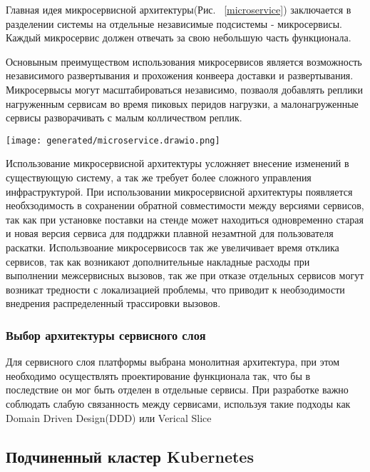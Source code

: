 Главная идея микросервисной архитектуры(Рис. ~\ref{microservice}) заключается в разделении системы на отдельные независимые подсистемы - микросервисы. Каждый микросервис должен отвечать за свою небольшую часть функционала.

Основыным преимуществом использования микросервисов является возможность независимого развертывания и прохожения конвеера доставки и развертывания. Микросервысы могут масштабироваться независимо, позваоля добавлять реплики нагруженным сервисам во время пиковых перидов нагрузки, а малонагруженные сервисы разворачивать с малым колличеством реплик.

\begin{figure*}[!t]
  \centering
  \texttt{[image: generated/microservice.drawio.png]}
  \caption{Приложение с микросервисной архитектурой}
  \label{microservice}
\end{figure*}

Использование микросервисной архитектуры усложняет внесение изменений в существующую систему, а так же требует более сложного управления инфраструктурой.
При использовании микросервисной архитектуры появляется необхзодимость в сохранении обратной совместимости между версиями сервисов, так как при установке поставки на стенде может находиться одновременно старая и новая версия сервиса для поддржки плавной незамтной для пользователя раскатки.
Использвоание микросервисосв так же увеличивает время отклика сервисов, так как возникают дополнительные накладные расходы при выполнении межсервисных вызовов, так же при отказе отдельных сервисов могут возникат тредности с локализацией проблемы, что приводит к необзодимости внедрения распределенный трассировки вызовов.

\subsubsection{Выбор архитектуры сервисного слоя}

Для сервисного слоя платформы выбрана  монолитная архитектура, при этом необходимо осуществлять проектирование функционала так, что бы в последствие он мог быть отделен в отдельные сервисы. При разработке важно соблюдать слабую связанность\cite{valipour2009brief} между сервисами, используя такие подходы как Domain Driven Design(DDD) \cite{evans2004domain} или Verical Slice\cite{ratner2011vertical}

\subsection{Подчиненный кластер Kubernetes}


